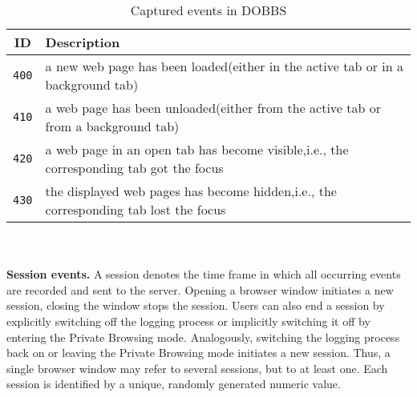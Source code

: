\documentclass[11pt,fleqn,twoside]{article}
\begin{document}
\begin{table}
\begin{center}
\begin{tabular}{|c|p{8cm}|}
  \hline
  \textbf{ID} & \textbf{Description} \\
  \hline\hline
  \texttt{400}   &  a new web page has been loaded\newline(either in the active tab or in a background tab)\\
  \hline
  \texttt{410}   &  a web page has been unloaded\newline(either from the active tab or from a background tab) \\
  \hline
  \texttt{420}   &  a web page in an open tab has become visible,\newline i.e., the corresponding tab got the focus \\
  \hline
  \texttt{430}   &  the displayed web pages has become hidden,\newline i.e., the corresponding tab lost the focus \\
  \hline
\end{tabular} 
\end{center}
\caption{Captured events in DOBBS} 
\label{tab:events}
\end{table}
\\
\\
\textbf{Session events.}
A session denotes the time frame in which all occurring events are recorded and sent to the server. Opening a browser window initiates a new session, closing the window stops the session. Users can also end a session by explicitly switching off the logging process or implicitly switching it off by entering the Private Browsing mode. Analogously, switching the logging process back on or leaving the Private Browsing mode initiates a new session. Thus, a single browser window may refer to several sessions, but to at least one. Each session is identified by a unique, randomly generated numeric value.
\end{document}
